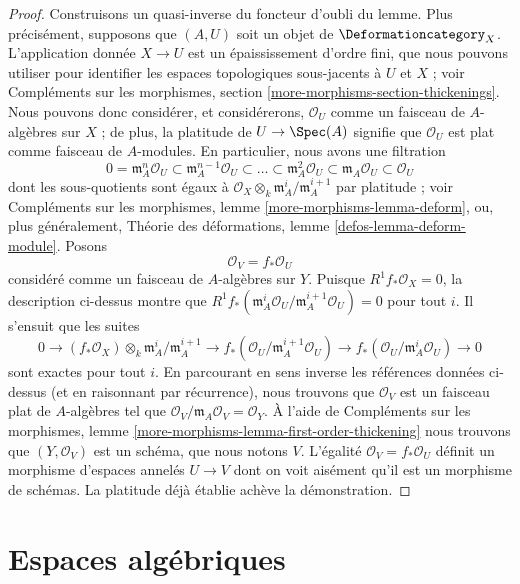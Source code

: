 \begin{proof}
Construisons un quasi-inverse du foncteur d'oubli du lemme.
Plus précisément, supposons que $(A, U)$ soit un objet de $\Deformationcategory_X$.
L'application donnée $X \to U$ est un épaississement d'ordre fini, que nous pouvons utiliser
pour identifier les espaces topologiques sous-jacents à $U$ et $X$ ; voir
Compléments sur les morphismes, section \ref{more-morphisms-section-thickenings}.
Nous pouvons donc considérer, et considérerons, $\mathcal{O}_U$ comme un faisceau de
$A$-algèbres sur $X$ ; de plus, la platitude de $U \to \Spec(A)$
signifie que $\mathcal{O}_U$ est plat comme faisceau de $A$-modules.
En particulier, nous avons une filtration
$$
0 = \mathfrak m_A^n\mathcal{O}_U \subset
\mathfrak m_A^{n - 1}\mathcal{O}_U \subset \ldots \subset
\mathfrak m_A^2\mathcal{O}_U \subset
\mathfrak m_A\mathcal{O}_U \subset \mathcal{O}_U
$$
dont les sous-quotients sont égaux à
$\mathcal{O}_X \otimes_k \mathfrak m_A^i/\mathfrak m_A^{i + 1}$
par platitude ; voir Compléments sur les morphismes, lemme \ref{more-morphisms-lemma-deform},
ou, plus généralement, Théorie des déformations, lemme \ref{defos-lemma-deform-module}.
Posons
$$
\mathcal{O}_V = f_*\mathcal{O}_U
$$
considéré comme un faisceau de $A$-algèbres sur $Y$. Puisque
$R^1f_*\mathcal{O}_X = 0$, la description ci-dessus montre que
$R^1f_*(\mathfrak m_A^i\mathcal{O}_U/\mathfrak m_A^{i + 1}\mathcal{O}_U) = 0$
pour tout $i$. Il s'ensuit que les suites
$$
0 \to
(f_*\mathcal{O}_X) \otimes_k \mathfrak m_A^i/\mathfrak m_A^{i + 1} \to
f_*(\mathcal{O}_U/\mathfrak m_A^{i + 1}\mathcal{O}_U) \to
f_*(\mathcal{O}_U/\mathfrak m_A^i\mathcal{O}_U) \to 0
$$
sont exactes pour tout $i$. En parcourant en sens inverse les références données ci-dessus
(et en raisonnant par récurrence), nous trouvons que $\mathcal{O}_V$ est un faisceau plat
de $A$-algèbres tel que
$\mathcal{O}_V/\mathfrak m_A\mathcal{O}_V = \mathcal{O}_Y$.
À l'aide de Compléments sur les morphismes, lemme
\ref{more-morphisms-lemma-first-order-thickening}
nous trouvons que $(Y, \mathcal{O}_V)$ est un schéma, que nous notons $V$.
L'égalité $\mathcal{O}_V = f_*\mathcal{O}_U$ définit un
morphisme d'espaces annelés $U \to V$ dont on voit aisément qu'il est
un morphisme de schémas. La platitude déjà établie
achève la démonstration.
\end{proof}







\section{Espaces algébriques}
\label{section-algebraic-spaces}

